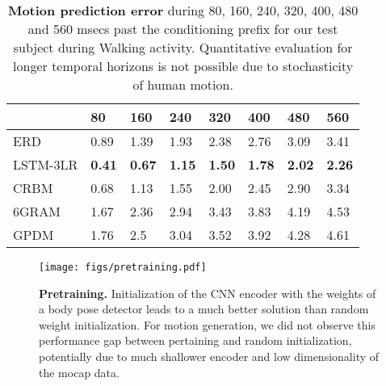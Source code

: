 \documentclass[10pt,twocolumn,letterpaper]{article}
\begin{document}
\begin{table}[h]{\small
\setlength{\tabcolsep}{2.5pt}
\begin{tabular}{|p{1.52cm}||p{0.75cm}|p{0.75cm}|p{0.75cm}|p{0.75cm}|p{0.75cm}|p{0.75cm}|p{0.75cm}|}
\cline{1-8}
                                             & {80}             & {160}       & {240}       &{320}       & {400} & {480} & {560} \\ \hline 
 ERD                                      & 0.89            & 1.39        & 1.93         & 2.38        & 2.76  &  3.09       &  3.41               \\ \hline 
 LSTM-3LR                           & \textbf{0.41} & \textbf{0.67} & \textbf{1.15} & \textbf{1.50} & \textbf{1.78} & \textbf{2.02} & \textbf{2.26}\\   \hline 
CRBM \cite{thr-mhmub-06} & 0.68              &         1.13      & 1.55             & 2.00             & 2.45              & 2.90              & 3.34\\\hline 
6GRAM &                              1.67                & 2.36              & 2.94              & 3.43             & 3.83             &4.19               &4.53  \\\hline 
GPDM \cite{Wang06gaussianprocess} & 1.76 & 2.5 & 3.04 & 3.52 & 3.92 & 4.28 & 4.61\\   \hline 
\end{tabular}
}
 \caption{ \textbf{Motion prediction error} during 80, 160, 240, 320, 400, 480 and 560 msecs past the conditioning prefix for our test subject during Walking activity.  %
 Quantitative evaluation for longer temporal horizons is not possible due to stochasticity of human motion. }
\label{tab:predictionerror}
\end{table}\begin{figure}[ht]
\begin{center}
\texttt{[image: figs/pretraining.pdf]}
\end{center}
\caption{\textbf{Pretraining.}  %
Initialization of the CNN encoder with the weights of a body pose detector leads to a much better solution than random weight initialization. For motion generation, we did not observe this  performance gap between pertaining and random initialization, potentially due to much shallower encoder and  low dimensionality of the mocap data.}
\label{fig:pretraining}
\end{figure}%
\end{document}
